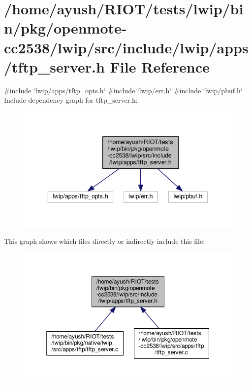 \hypertarget{openmote-cc2538_2lwip_2src_2include_2lwip_2apps_2tftp__server_8h}{}\section{/home/ayush/\+R\+I\+O\+T/tests/lwip/bin/pkg/openmote-\/cc2538/lwip/src/include/lwip/apps/tftp\+\_\+server.h File Reference}
\label{openmote-cc2538_2lwip_2src_2include_2lwip_2apps_2tftp__server_8h}
{\ttfamily \#include \char`\"{}lwip/apps/tftp\+\_\+opts.\+h\char`\"{}}\newline
{\ttfamily \#include \char`\"{}lwip/err.\+h\char`\"{}}\newline
{\ttfamily \#include \char`\"{}lwip/pbuf.\+h\char`\"{}}\newline
Include dependency graph for tftp\+\_\+server.\+h\+:
\nopagebreak
\begin{figure}[H]
\begin{center}
\leavevmode
\includegraphics[width=343pt]{openmote-cc2538_2lwip_2src_2include_2lwip_2apps_2tftp__server_8h__incl}
\end{center}
\end{figure}
This graph shows which files directly or indirectly include this file\+:
\nopagebreak
\begin{figure}[H]
\begin{center}
\leavevmode
\includegraphics[width=350pt]{openmote-cc2538_2lwip_2src_2include_2lwip_2apps_2tftp__server_8h__dep__incl}
\end{center}
\end{figure}

